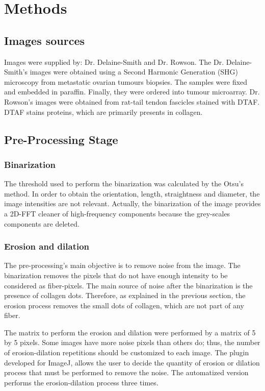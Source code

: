 \documentclass[12pt,a4paper]{article}
\begin{document}
\section{Methods}
\subsection{Images sources}
Images were supplied by: Dr. Delaine-Smith and Dr. Rowson. The  Dr. Delaine-Smith's images were obtained using a Second Harmonic Generation (SHG) microscopy from metastatic ovarian tumours biopsies. The samples were fixed and  embedded in paraffin. Finally, they were ordered into tumour microarray.  Dr. Rowson's images were obtained from rat-tail tendon fascicles stained with DTAF. DTAF stains proteins, which are primarily presents in collagen.

\subsection{Pre-Processing Stage}
\subsubsection{Binarization}
The threshold used to perform the binarization was calculated by the Otsu’s method. In order to obtain the orientation, length, straightness and diameter, the image intensities are not relevant. Actually, the binarization of the image provides a 2D-FFT cleaner of high-frequency components because the grey-scales components are deleted.
\subsubsection{Erosion and dilation}
The pre-processing's main objective is to remove noise from the image. The binarization removes the pixels that do not have enough intensity to be considered as fiber-pixels. The main source of noise after the binarization is the presence of collagen dots. Therefore, as explained in the previous section, the erosion process removes the small dots of collagen, which are not part of any fiber.

The matrix to perform the erosion and dilation were performed by a matrix of 5 by 5 pixels. Some images have more noise pixels than others do; thus, the number of erosion-dilation repetitions should be customized to each image. The plugin developed for ImageJ, allows the user to decide the quantity of erosion or dilation process that must be performed to remove the noise. The automatized version performs the erosion-dilation process three times.
\end{document}
